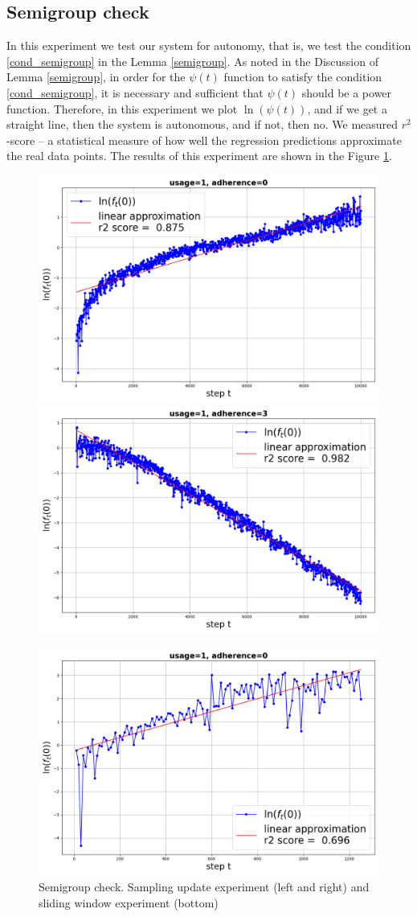 \documentclass{article}
\begin{document}
    \subsection{Semigroup check} \label{exp_4}

        In this experiment we test our system for autonomy, that is, we test the condition \eqref{cond_semigroup} in the Lemma \ref{semigroup}. As noted in the Discussion of Lemma \ref{semigroup}, in order for the $\psi(t)$ function to satisfy the condition \eqref{cond_semigroup}, it is necessary and sufficient that $\psi(t)$ should be a power function. Therefore, in this experiment we plot $\ln(\psi(t))$, and if we get a straight line, then the system is autonomous, and if not, then no. We measured $r^2$-score -- a statistical measure of how well the regression predictions approximate the real data points. The results of this experiment are shown in the Figure \ref{fig_exp_4}.

        \begin{figure}[h!]
            \centering
            \includegraphics[width=0.49\linewidth]{pictures/semigroup_sample_1_0.png}
            \includegraphics[width=0.49\linewidth]{pictures/semigroup_sample_1_3.png}
            
            \includegraphics[width=0.49\linewidth]{pictures/semigroup_loop_1_0.png}
            
            \caption{Semigroup check. Sampling update experiment (left and right) and sliding window experiment (bottom)}
            \label{fig_exp_4}
        \end{figure}
\end{document}
